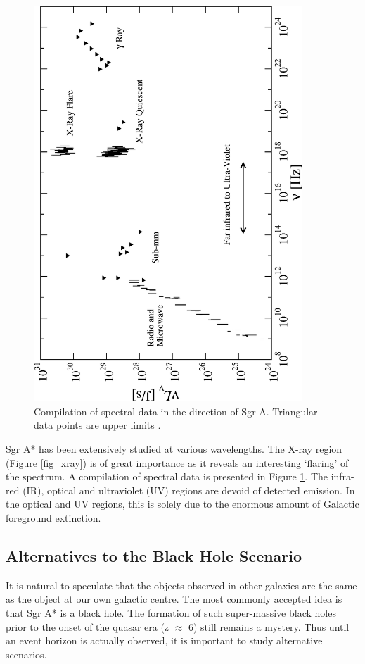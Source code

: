 \begin{figure}[t]
	\begin{center}
	\includegraphics[angle=-90,width=0.9\textwidth]{eps/submm-nuL.eps}
	\caption{Compilation of spectral data in the direction of Sgr A. Triangular data points are upper limits \cite{ref_cokerthesis}.}
	\label{fig_compiledspectrum}
	\end{center}
\end{figure}

Sgr A* has been extensively studied at various wavelengths. The X-ray region (Figure \ref{fig_xray}) is of great importance
as it reveals an interesting `flaring' of the spectrum.
A compilation of spectral data is presented in Figure \ref{fig_compiledspectrum}.
The infra-red (IR), optical and ultraviolet (UV) regions are devoid of detected emission. In the optical and UV regions,
this is solely due to the enormous amount of Galactic foreground extinction.

\subsection{Alternatives to the Black Hole Scenario}
It is natural to speculate that the objects observed in other galaxies are the same as the object at our own galactic centre. The
most commonly accepted idea is that Sgr A* is a black hole. The formation of such super-massive black holes prior to the onset of the
quasar era (z $\approx$ 6) still remains a mystery. Thus until an event horizon is actually observed, it is important to study
alternative scenarios.

